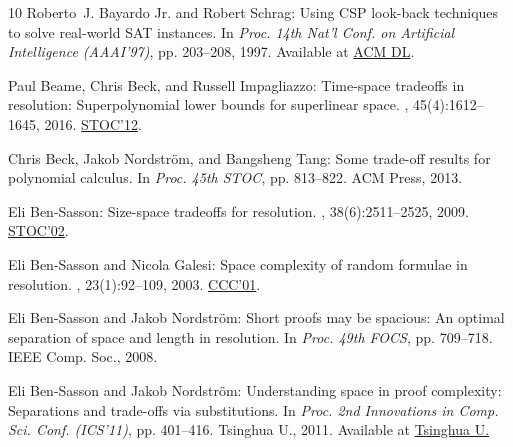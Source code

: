\begin{thebibliography}{10}
{\sc Roberto~J. {Bayardo Jr.} and Robert Schrag}: Using {CSP} look-back
  techniques to solve real-world {SAT} instances.
\newblock In {\em Proc. 14th Nat'l Conf. on Artificial Intelligence
  ({AAAI'97})}, pp. 203--208, 1997.
\newblock Available at
  \href{https://dl.acm.org/doi/10.5555/1867406.1867438}{ACM DL}.

{\sc Paul Beame, Chris Beck, and Russell Impagliazzo}: Time-space tradeoffs in
  resolution: {S}uperpolynomial lower bounds for superlinear space.
, 45(4):1612--1645, 2016.
\newblock \prelim \href{https://doi.org/10.1145/2213977.2213999}{STOC'12}.
\newblock [\epfmtdoi{10.1137/130914085}]

{\sc Chris Beck, Jakob Nordström, and Bangsheng Tang}: Some trade-off results
  for polynomial calculus.
\newblock In {\em Proc. 45th STOC}, pp. 813--822. ACM Press, 2013.
\newblock [\epfmtdoi{10.1145/2488608.2488711}]

{\sc Eli {Ben-Sasson}}: Size-space tradeoffs for resolution.
, 38(6):2511--2525, 2009.
\newblock \prelim \href{https://doi.org/10.1145/509907.509975}{STOC'02}.
\newblock [\epfmtdoi{10.1137/080723880}]

{\sc Eli {Ben-Sasson} and Nicola Galesi}: Space complexity of random formulae
  in resolution.
, 23(1):92--109, 2003.
\newblock \prelim \href{https://doi.org/10.1109/CCC.2001.933871}{CCC'01}.

{\sc Eli {Ben-Sasson} and Jakob Nordström}: Short proofs may be spacious: {A}n
  optimal separation of space and length in resolution.
\newblock In {\em Proc. 49th FOCS}, pp. 709--718. IEEE Comp. Soc., 2008.

{\sc Eli {Ben-Sasson} and Jakob Nordström}: Understanding space in proof
  complexity: Separations and trade-offs via substitutions.
\newblock In {\em Proc. 2nd Innovations in Comp. Sci. Conf. (ICS'11)}, pp.
  401--416. Tsinghua U., 2011.
\newblock Available at
  \href{http://conference.iiis.tsinghua.edu.cn/ICS2011/content/papers/3.html}{Tsinghua
  U.}


\end{thebibliography}
